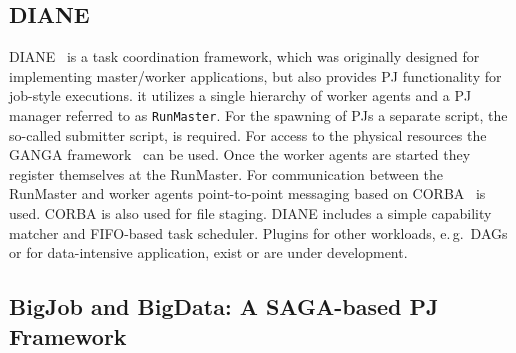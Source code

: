 \documentclass[conference]{IEEEtran}
\begin{document}


\subsection{DIANE}
DIANE~\cite{Moscicki:908910} is a task coordination framework, which
was originally designed for implementing master/worker applications,
but also provides PJ functionality for job-style executions. it
utilizes a single hierarchy of worker agents and a PJ manager referred
to as \texttt{RunMaster}.  For the spawning of PJs a separate script,
the so-called submitter script, is required. For access to the
physical resources the GANGA framework~\cite{Moscicki20092303} can be
used.  Once the worker agents are started they register themselves at
the RunMaster.  For communication between the RunMaster and worker
agents point-to-point messaging based on
CORBA~\cite{OMG-CORBA303:2004} is used. CORBA is also used for file
staging.  DIANE includes a simple capability matcher and FIFO-based
task scheduler.  Plugins for other workloads, e.\,g.\ DAGs or for
data-intensive application, exist or are under development. 


\subsection{BigJob and BigData: A SAGA-based PJ Framework}
\label{sec:bigjob_description}






\end{document}
